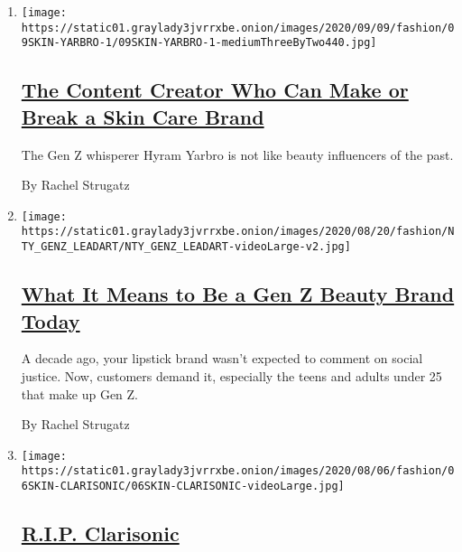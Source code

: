 \begin{enumerate}
\def\labelenumi{\arabic{enumi}.}
\item
  \texttt{[image: https://static01.graylady3jvrrxbe.onion/images/2020/09/09/fashion/09SKIN-YARBRO-1/09SKIN-YARBRO-1-mediumThreeByTwo440.jpg]}

  \hypertarget{the-content-creator-who-can-make-or-break-a-skin-care-brand}{%
  \subsection{\texorpdfstring{\href{/2020/09/08/style/Gen-Z-the-content-creator-who-can-make-or-break-your-skin-care-brand.html}{The
  Content Creator Who Can Make or Break a Skin Care
  Brand}}{The Content Creator Who Can Make or Break a Skin Care Brand}}\label{the-content-creator-who-can-make-or-break-a-skin-care-brand}}

  The Gen Z whisperer Hyram Yarbro is not like beauty influencers of the
  past.

  By Rachel Strugatz
\item
  \texttt{[image: https://static01.graylady3jvrrxbe.onion/images/2020/08/20/fashion/NTY\_GENZ\_LEADART/NTY\_GENZ\_LEADART-videoLarge-v2.jpg]}

  \hypertarget{what-it-means-to-be-a-gen-z-beauty-brand-today}{%
  \subsection{\texorpdfstring{\href{/2020/08/18/style/what-it-means-to-be-a-gen-z-beauty-brand-today.html}{What
  It Means to Be a Gen Z Beauty Brand
  Today}}{What It Means to Be a Gen Z Beauty Brand Today}}\label{what-it-means-to-be-a-gen-z-beauty-brand-today}}

  A decade ago, your lipstick brand wasn't expected to comment on social
  justice. Now, customers demand it, especially the teens and adults
  under 25 that make up Gen Z.

  By Rachel Strugatz
\item
  \texttt{[image: https://static01.graylady3jvrrxbe.onion/images/2020/08/06/fashion/06SKIN-CLARISONIC/06SKIN-CLARISONIC-videoLarge.jpg]}

  \hypertarget{rip-clarisonic}{%
  \subsection{\texorpdfstring{\href{/2020/08/05/style/skin-care-rip-clarisonic.html}{R.I.P.
  Clarisonic}}{R.I.P. Clarisonic}}\label{rip-clarisonic}}


\end{enumerate}
